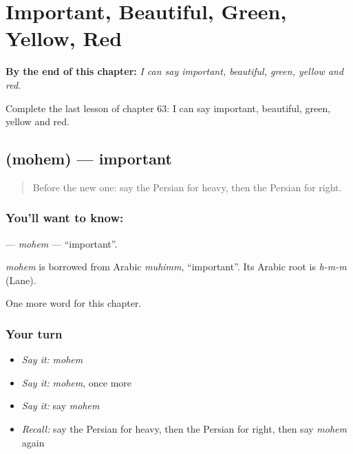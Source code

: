 
\chapter{Important, Beautiful, Green, Yellow, Red}
\label{ch:fa-important-beautiful-green-yellow-red}

\begin{chapteropening}
\textbf{By the end of this chapter:} \emph{I can say important, beautiful, green, yellow and red.}

Complete the last lesson of chapter 63: I can say important, beautiful, green, yellow and red.
\end{chapteropening}

\section[\texorpdfstring{\fa{مهم} (mohem)}{مهم (mohem)}]{ (mohem) — important}

\label{lesson:FA-C63-mohem}



\begin{quote}
Before the new one: say the Persian for heavy, then the Persian for right.
\end{quote}

\subsection*{You'll want to know: }
\textbf{} — \emph{mohem} — \textquotedblleft{}important\textquotedblright{}.

\begin{cousinweb}
\emph{mohem} is borrowed from Arabic \emph{muhimm}, \textquotedblleft{}important\textquotedblright{}. Its Arabic root is \emph{h-m-m} (Lane).
\end{cousinweb}

\begin{grammarlens}[title={What you've built}]
One more word for this chapter.
\end{grammarlens}

\subsection*{Your turn}
\begin{itemize}
\raggedright
  \item \emph{Say it:} \emph{mohem}
  \item \emph{Say it:} \emph{mohem}, once more
  \item \emph{Say it:} say \emph{mohem}
  \item \emph{Recall:} say the Persian for heavy, then the Persian for right, then say \emph{mohem} again
\end{itemize}

